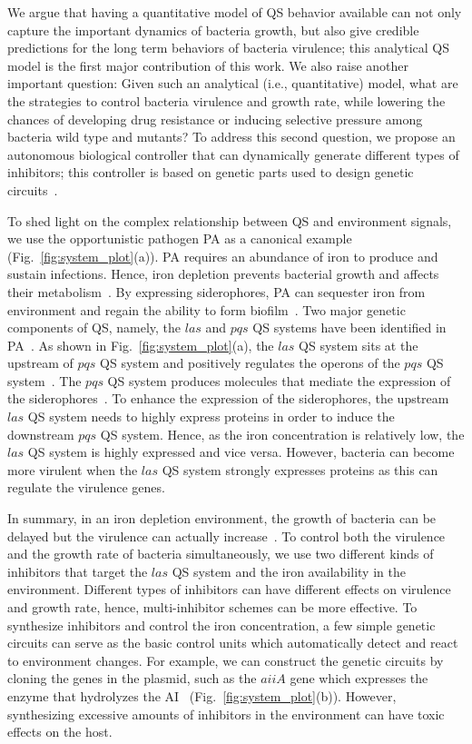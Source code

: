 \documentclass[runningheads]{llncs}
\begin{document}
We argue that having a quantitative model of QS behavior available can not only capture the important dynamics of bacteria growth, but also give credible predictions for the long term behaviors of bacteria virulence; this analytical QS model is the first major contribution of this work. We also raise another important question: Given such an analytical (i.e., quantitative) model, what are the strategies to control bacteria virulence and growth rate, while lowering the chances of developing drug resistance or inducing selective pressure among bacteria wild type and mutants?  To address this second question, we propose an autonomous biological controller that can dynamically generate different types of inhibitors; this controller is based on genetic parts used to design genetic circuits~\cite{Arpino2013}. 


To shed light on the complex relationship between QS and environment signals, we use the opportunistic pathogen PA as a canonical example (Fig.~\ref{fig:system_plot}(a)). PA requires an abundance of iron to produce and sustain infections. Hence, iron depletion prevents bacterial growth and affects their metabolism~\cite{Vasil1999}. By expressing siderophores, PA can sequester iron from environment and regain the ability to form biofilm~\cite{Yang2007}. Two major genetic components of QS, namely, the $las$ and $pqs$ QS systems have been identified in PA~\cite{Bredenbruch2006}. As shown in Fig.~\ref{fig:system_plot}(a), the $las$ QS system sits at the upstream of $pqs$ QS system and positively regulates the operons of the $pqs$ QS system~\cite{Balasubramanian2013}. The $pqs$ QS system produces molecules that mediate the expression of the siderophores~\cite{Bredenbruch2006}\cite{Diggle2007}. To enhance the expression of the siderophores, the upstream $las$ QS system needs to highly express proteins in order to induce the downstream $pqs$ QS system. Hence, as the iron concentration is relatively low, the $las$ QS system is highly expressed and vice versa. However, bacteria can become more virulent when the $las$ QS system strongly expresses proteins as this can regulate the virulence genes. 

In summary, in an iron depletion environment, the growth of bacteria can be delayed but the virulence can actually increase~\cite{Kim2005}. To control both the virulence and the growth rate of bacteria simultaneously, we use two different kinds of inhibitors that target the $las$ QS system and the iron availability in the environment. Different types of inhibitors can have different effects on virulence and growth rate, hence, multi-inhibitor schemes can be more effective.  To synthesize inhibitors and control the iron concentration, a few simple genetic circuits can serve as the basic control units which automatically detect and react to environment changes. For example, we can construct the genetic circuits by cloning the genes in the plasmid, such as the $aiiA$ gene which expresses the enzyme that hydrolyzes the AI~\cite{Park2008} (Fig.~\ref{fig:system_plot}(b)). However, synthesizing excessive amounts of inhibitors in the environment can have toxic effects on the host. 
 
\end{document}
